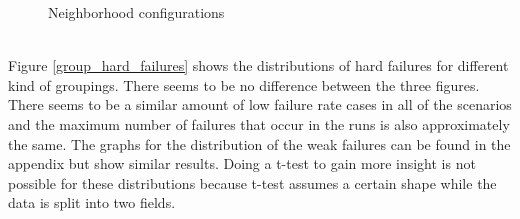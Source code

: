 \documentclass[a4paper]{article}
\begin{document}
\begin{figure}[!ht]
\caption{Neighborhood configurations}
\label{group_averages}
\end{figure}
\\
Figure \ref{group_hard_failures} shows the distributions of hard failures for different kind of groupings. There seems to be no difference
between the three figures. There seems to be a similar amount of low failure rate cases in all of the scenarios and the maximum number
of failures that occur in the runs is also approximately the same. The graphs for the distribution of the weak failures can be 
found in the appendix but show similar results. Doing a t-test to gain more insight is not possible for these 
distributions because t-test assumes a certain shape while the data is split into two fields. \\
\end{document}
